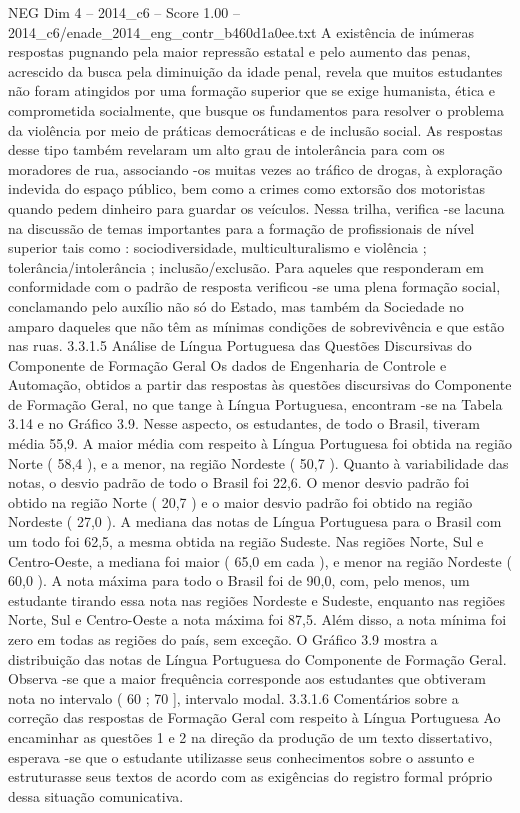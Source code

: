 \begin{textsample}{NEG Dim 4 – 2014\_c6 – Score 1.00 – 2014\_c6/enade\_2014\_eng\_contr\_b460d1a0ee.txt}
A existência de inúmeras respostas pugnando pela maior repressão estatal e pelo aumento das penas, acrescido da busca pela diminuição da idade penal, revela que muitos estudantes não foram atingidos por uma formação superior que se exige humanista, ética e comprometida socialmente, que busque os fundamentos para resolver o problema da violência por meio de práticas democráticas e de inclusão social.
As respostas desse tipo também revelaram um alto grau de intolerância para com os moradores de rua, associando -os muitas vezes ao tráfico de drogas, à exploração indevida do espaço público, bem como a crimes como extorsão dos motoristas quando pedem dinheiro para guardar os veículos.
Nessa trilha, verifica -se lacuna na discussão de temas importantes para a formação de profissionais de nível superior tais como : sociodiversidade, multiculturalismo e violência ; tolerância/intolerância ; inclusão/exclusão.
Para aqueles que responderam em conformidade com o padrão de resposta verificou -se uma plena formação social, conclamando pelo auxílio não só do Estado, mas também da Sociedade no amparo daqueles que não têm as mínimas condições de sobrevivência e que estão nas ruas. 3.3.1.5 Análise de Língua Portuguesa das Questões Discursivas do Componente de Formação Geral Os dados de Engenharia de Controle e Automação, obtidos a partir das respostas às questões discursivas do Componente de Formação Geral, no que tange à Língua Portuguesa, encontram -se na Tabela 3.14 e no Gráfico 3.9.
Nesse aspecto, os estudantes, de todo o Brasil, tiveram média 55,9.
A maior média com respeito à Língua Portuguesa foi obtida na região Norte ( 58,4 ), e a menor, na região Nordeste ( 50,7 ).
Quanto à variabilidade das notas, o desvio padrão de todo o Brasil foi 22,6.
O menor desvio padrão foi obtido na região Norte ( 20,7 ) e o maior desvio padrão foi obtido na região Nordeste ( 27,0 ).
A mediana das notas de Língua Portuguesa para o Brasil com um todo foi 62,5, a mesma obtida na região Sudeste.
Nas regiões Norte, Sul e Centro-Oeste, a mediana foi maior ( 65,0 em cada ), e menor na região Nordeste ( 60,0 ).
A nota máxima para todo o Brasil foi de 90,0, com, pelo menos, um estudante tirando essa nota nas regiões Nordeste e Sudeste, enquanto nas regiões Norte, Sul e Centro-Oeste a nota máxima foi 87,5.
Além disso, a nota mínima foi zero em todas as regiões do país, sem exceção.
O Gráfico 3.9 mostra a distribuição das notas de Língua Portuguesa do Componente de Formação Geral.
Observa -se que a maior frequência corresponde aos estudantes que obtiveram nota no intervalo ( 60 ; 70 ], intervalo modal. 3.3.1.6 Comentários sobre a correção das respostas de Formação Geral com respeito à Língua Portuguesa Ao encaminhar as questões 1 e 2 na direção da produção de um texto dissertativo, esperava -se que o estudante utilizasse seus conhecimentos sobre o assunto e estruturasse seus textos de acordo com as exigências do registro formal próprio dessa situação comunicativa.

\end{textsample}
